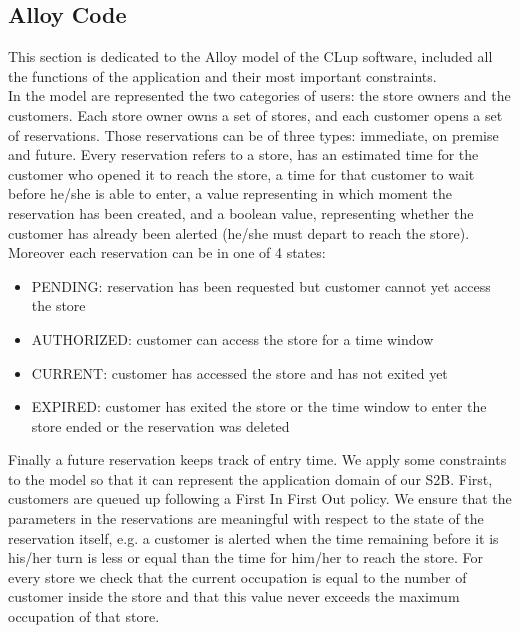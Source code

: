 \subsection{Alloy Code}
This section is dedicated to the Alloy model of the CLup  software, included all the functions of the application and their most important constraints.\\
In the model are represented the two categories of users: the store owners and the customers. Each store owner owns a set of stores, and each customer opens a set of reservations. Those reservations can be of three types: immediate, on premise and future. Every reservation refers to a store, has an estimated time for the customer who opened it to reach the store, a time for that customer to wait before he/she is able to enter, a value representing in which moment the reservation has been created, and a boolean value, representing whether the customer has already been alerted (he/she must depart to reach the store). Moreover each reservation can be in one of 4 states:
\begin{itemize}
	\item PENDING: reservation has been requested but customer cannot yet access the store
	\item AUTHORIZED: customer can access the store for a time window
	\item CURRENT: customer has accessed the store and has not exited yet
	\item EXPIRED: customer has exited the store or the time window to enter the store ended or the reservation was deleted
\end{itemize}
Finally a future reservation keeps track of entry time.
We apply some constraints to the model so that it can represent the application domain of our S2B.
First, customers are queued up following a First In First Out policy. We ensure that the parameters in the reservations are meaningful with respect to the state of the reservation itself, e.g. a customer is alerted when the time remaining before it is his/her turn is less or equal than the time for him/her to reach the store. For every store we check that the current occupation is equal to the number of customer inside the store and that this value never exceeds the maximum occupation of that store.


\newpage
